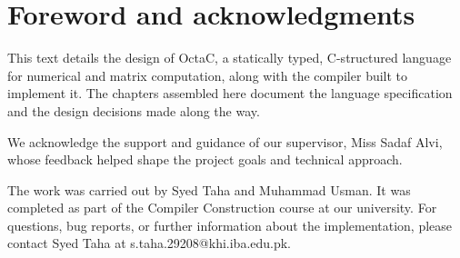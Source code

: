 \chapter*{Foreword and acknowledgments}

This text details the design of OctaC, a statically typed, C-structured
language for numerical and matrix computation, along with the compiler
built to implement it. The chapters assembled here document the language
specification and the design decisions made along the way.

We acknowledge the support and guidance of our supervisor, Miss Sadaf Alvi,
whose feedback helped shape the project goals and technical approach.

The work was carried out by Syed Taha and Muhammad Usman. It was completed
as part of the Compiler Construction course at our university. For
questions, bug reports, or further information about the implementation,
please contact Syed Taha at s.taha.29208@khi.iba.edu.pk.
